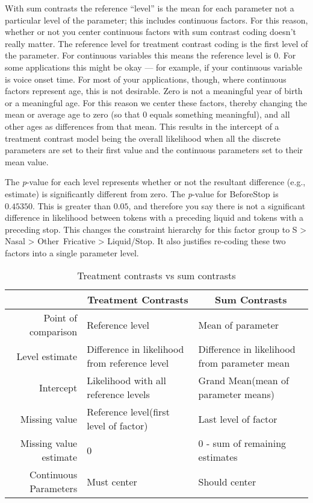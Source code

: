 \documentclass[
  10pt,
  letterpaper]{article}
\renewcommand\texttt[1]{{\ttfamily\color{BrickRed}#1}}
\begin{document}
With sum contrasts the reference ``level'' is the mean for each
parameter not a particular level of the parameter; this includes
continuous factors. For this reason, whether or not you center
continuous factors with sum contrast coding doesn't really matter. The
reference level for treatment contrast coding is the first level of the
parameter. For continuous variables this means the reference level is
\(0\). For some applications this might be okay --- for example, if your
continuous variable is voice onset time. For most of your applications,
though, where continuous factors represent age, this is not desirable.
Zero is not a meaningful year of birth or a meaningful age. For this
reason we center these factors, thereby changing the mean or average age
to zero (so that \(0\) equals something meaningful), and all other ages
as differences from that mean. This results in the intercept of a
treatment contrast model being the overall likelihood when all the
discrete parameters are set to their first value and the continuous
parameters set to their mean value.

The \emph{p}-value for each level represents whether or not the
resultant difference (e.g., estimate) is significantly different from
zero. The \emph{p}-value for \texttt{BeforeStop} is \(0.45350\). This is
greater than \(0.05\), and therefore you say there is not a significant
difference in likelihood between tokens with a preceding liquid and
tokens with a preceding stop. This changes the constraint hierarchy for
this factor group to \texttt{S} \textgreater{} \texttt{Nasal}
\textgreater{} \texttt{Other\ Fricative} \textgreater{}
\texttt{Liquid/Stop}. It also justifies re-coding these two factors into
a single parameter level.

\begin{table}
\begin{center}
\caption*{Treatment contrasts vs sum contrasts} 
\begin{tabular}{rp{}p{}}
\toprule
& \multicolumn{1}{c}{Treatment Contrasts} & \multicolumn{1}{c}{Sum Contrasts}\\
\midrule
Point of comparison & Reference level & Mean of parameter\\
Level estimate & Difference in likelihood \newline from reference level & Difference in likelihood \newline from parameter mean\\
Intercept & Likelihood with all reference levels & Grand Mean\newline (mean of parameter means)\\
Missing value & Reference level\newline(first level of factor) & Last level of factor\\
Missing value estimate & 0 & 0 - sum of remaining estimates\\
Continuous Parameters & Must center & Should center\\
\bottomrule
\end{tabular}
\end{center}
\end{table}
\end{document}
